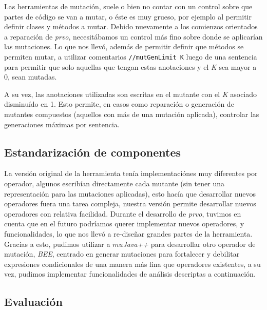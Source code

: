 Las herramientas de mutaci\'on, suele o bien no contar con un control sobre que partes de c\'odigo se van a mutar, o \'este es muy grueso, por ejemplo al permitir definir clases y m\'etodos a mutar. Debido nuevamente a los comienzos orientados a reparaci\'on de \emph{prvo}, necesit\'abamos un control m\'as fino sobre donde se aplicar\'ian las mutaciones. Lo que nos llev\'o, adem\'as de permitir definir que m\'etodos se permiten mutar, a utilizar comentarios \lstinline|//mutGenLimit K| luego de una sentencia para permitir que solo aquellas que tengan estas anotaciones y el \emph{K} sea mayor a 0, sean mutadas.

A su vez, las anotaciones utilizadas son escritas en el mutante con el \emph{K} asociado disminu\'ido en 1. Esto permite, en casos como reparaci\'on o generaci\'on de mutantes compuestos (aquellos con m\'as de una mutaci\'on aplicada), controlar las generaciones m\'aximas por sentencia.

\subsection{Estandarizaci\'on de componentes}

La versi\'on original de la herramienta ten\'ia implementaci\'ones muy diferentes por operador, algunos escrib\'ian directamente cada mutante (sin tener una representaci\'on para las mutaciones aplicadas), esto hac\'ia que desarrollar nuevos operadores fuera una tarea compleja, nuestra versi\'on permite desarrollar nuevos operadores con relativa facilidad. Durante el desarrollo de \emph{prvo}, tuvimos en cuenta que en el futuro podr\'iamos querer implementar nuevos operadores, y funcionalidades, lo que nos llev\'o a re-dise\~nar grandes partes de la herramienta. Gracias a esto, pudimos utilizar a \emph{$mu$Java++} para desarrollar otro operador de mutaci\'on, \emph{BEE}, centrado en generar mutaciones para fortalecer y debilitar expresiones condicionales de una manera m\'as fina que operadores existentes, a su vez, pudimos implementar funcionalidades de an\'alisis descriptas a continuaci\'on.

\subsection{Evaluaci\'on}

